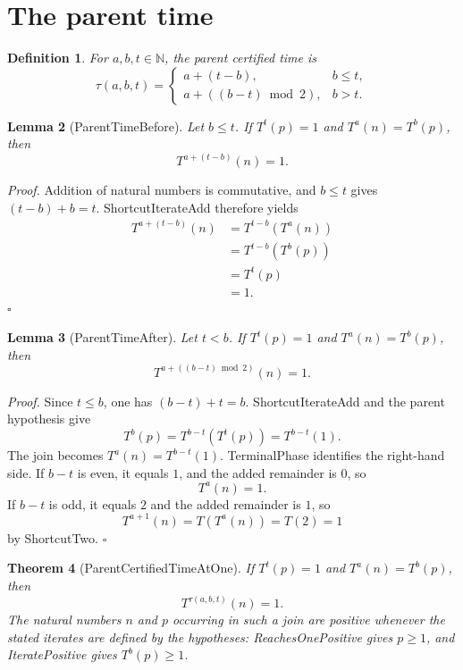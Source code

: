 \documentclass[11pt,letterpaper]{article}
\newcommand{\N}{\mathbb{N}}
\newtheorem{theorem}{Theorem}
\newtheorem{lemma}[theorem]{Lemma}
\newtheorem{definition}[theorem]{Definition}
\newenvironment{proof}{\noindent\textit{Proof.}}{\hfill\(\square\)}
\begin{document}
\section{The parent time}

\begin{definition}
For \(a,b,t\in\N\), the parent certified time is
\[
  \tau(a,b,t)=
  \begin{cases}
    a+(t-b),&b\le t,\\
    a+((b-t)\bmod 2),&b>t.
  \end{cases}
\]
\end{definition}

\begin{lemma}[ParentTimeBefore]
Let \(b\le t\). If \(T^{t}(p)=1\) and \(T^{a}(n)=T^{b}(p)\), then
\[
  T^{a+(t-b)}(n)=1.
\]
\end{lemma}

\begin{proof}
Addition of natural numbers is commutative, and \(b\le t\) gives \((t-b)+b=t\). ShortcutIterateAdd therefore yields
\begin{align*}
  T^{a+(t-b)}(n)
  &=T^{t-b}(T^{a}(n))\\
  &=T^{t-b}(T^{b}(p))\\
  &=T^{t}(p)\\
  &=1.
\end{align*}
\end{proof}

\begin{lemma}[ParentTimeAfter]
Let \(t<b\). If \(T^{t}(p)=1\) and \(T^{a}(n)=T^{b}(p)\), then
\[
  T^{a+((b-t)\bmod 2)}(n)=1.
\]
\end{lemma}

\begin{proof}
Since \(t\le b\), one has \((b-t)+t=b\). ShortcutIterateAdd and the parent hypothesis give
\[
  T^{b}(p)=T^{b-t}(T^{t}(p))=T^{b-t}(1).
\]
The join becomes \(T^{a}(n)=T^{b-t}(1)\). TerminalPhase identifies the right-hand side. If \(b-t\) is even, it equals \(1\), and the added remainder is \(0\), so
\[
  T^{a}(n)=1.
\]
If \(b-t\) is odd, it equals \(2\) and the added remainder is \(1\), so
\[
  T^{a+1}(n)=T(T^{a}(n))=T(2)=1
\]
by ShortcutTwo.
\end{proof}

\begin{theorem}[ParentCertifiedTimeAtOne]
If \(T^{t}(p)=1\) and \(T^{a}(n)=T^{b}(p)\), then
\[
  T^{\tau(a,b,t)}(n)=1.
\]
The natural numbers \(n\) and \(p\) occurring in such a join are positive whenever the stated iterates are defined by the hypotheses: ReachesOnePositive gives \(p\ge 1\), and IteratePositive gives \(T^{b}(p)\ge 1\).
\end{theorem}
\end{document}
